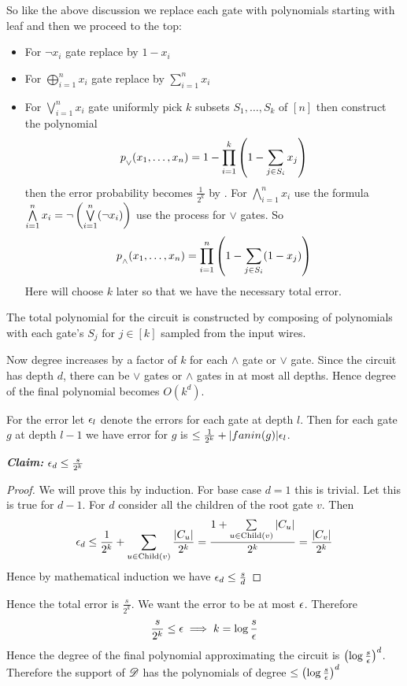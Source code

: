 \begin{proof-of-lemma}
So like the above discussion we replace each gate with polynomials starting with leaf and then we proceed to the top:\begin{itemize}
	\item For $\neg x_i$ gate replace by $1-x_i$
	\item For $\bigoplus\limits_{i=1}^n x_i$ gate replace by $\sum\limits_{i=1}^n x_i$
	\item For  $\bigvee\limits_{i=1}^n x_i$ gate uniformly pick $k$ subsets $S_1,\dots, S_k$  of $[n]$ then construct the polynomial $$p\strut_{\vee}(x_1,\dots, x_n)=1-\prod\limits_{i=1}^k \left(1-\sum\limits_{j\in S_i} x_j\right)$$ then the error probability becomes $\frac1{2^k}$ by  . For $\bigwedge\limits_{i=1}^n x_i$ use the formula $\bigwedge\limits_{i=1}^n x_i=\neg \left( \bigvee\limits_{i=1}^n (\neg x_i) \right)$ use the process for $\vee$ gates. So $$p\strut_{\wedge}(x_1,\dots, x_n)= \prod\limits_{i=1}^n \left(1-\sum\limits_{j\in S_i}(1-x_j)\right)$$Here will choose $k$ later so that we have the necessary total error. 
\end{itemize}
The total polynomial for the circuit is constructed by composing of polynomials with each gate's $S_j$ for $j\in[k]$ sampled from the input wires.

Now degree increases by a factor of $k$ for each $\wedge$ gate or $\vee$ gate. Since the circuit has depth $d$, there can be $\vee$ gates or $\wedge$ gates in at most all depths. Hence degree of the final polynomial becomes $O(k^d)$. 

For the error let $\epsilon_l$ denote the errors for each gate at depth $l$. Then for each gate $g$ at depth $l-1$ we have error for $g$ is $\leq \frac1{2^k}+|fanin(g)|\epsilon_l$.\parinf\vspace*{2mm}
\begin{center}
	
\begin{minipage}{0.9\textwidth}
	\textbf{\textit{Claim:}} $\epsilon_d\leq \frac{s}{2^k}$

\begin{proof}
	We will prove this by induction. For base case $d=1$ this is trivial. Let this is true for $d-1$. For $d$ consider all the children of the root gate $v$. Then $$\epsilon_d\leq \frac{1}{2^k}+\sum\limits_{u\in \text{Child}(v)}\frac{|C_u|}{2^k}=\frac{1+\sum\limits_{u\in \text{Child}(v)}|C_u|}{2^k}=\frac{|C_v|}{2^k}$$ Hence by mathematical induction we have $\epsilon_d\leq \frac{s}{d}$
\end{proof}
\end{minipage}
\end{center}

Hence the total error is $\frac{s}{2^k}$. We want the error to be at most $\epsilon$. Therefore $$\frac{s}{2^k}\leq \epsilon\implies k=\log \frac{s}{\epsilon}$$Hence the degree of the final polynomial approximating the circuit is $\left(\log \frac{s}{\epsilon}\right)^d$. Therefore the support of ${\mathscr{D}}$ has the polynomials of degree $\leq \left(\log \frac{s}{\epsilon}\right)^d$
\end{proof-of-lemma}


